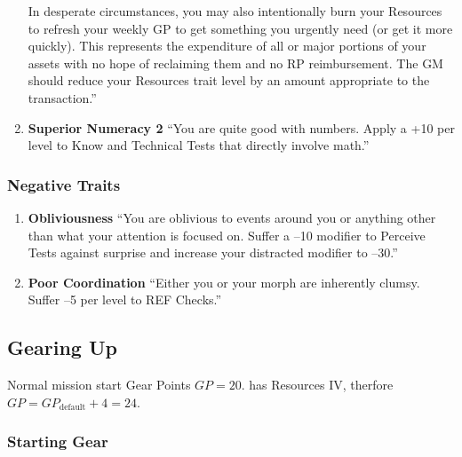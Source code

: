 \begin{enumerate}
    In desperate circumstances, you may also intentionally burn your Resources to refresh your weekly GP to get something you urgently need (or get it more quickly). This represents the expenditure of all or major portions of your assets with no hope of reclaiming them and no RP reimbursement. The GM should reduce your Resources trait level by an amount appropriate to the transaction.” \citep[pg. 76]{ep2e_1.1_2019}

    \item \textbf{\gls{Superior Numeracy} 2} “You are quite good with numbers. Apply a +10 per level to Know and Technical Tests that directly involve math.” \citep[pg. 76]{ep2e_1.1_2019}
\end{enumerate}


\subsubsection{Negative Traits}

\begin{enumerate}
    \item \textbf{\gls{Obliviousness}} “You are oblivious to events around you or anything other than what your attention is focused on. Suffer a –10 modifier to Perceive Tests against surprise and increase your distracted modifier to –30.” \citep[pg. 79]{ep2e_1.1_2019}

    \item \textbf{\gls{Poor Coordination}} “Either you or your morph are inherently clumsy. Suffer –5 per level to REF Checks.” \citep[pg. 79]{ep2e_1.1_2019}
\end{enumerate}


\subsection{Gearing Up}

Normal mission start Gear Points $GP=20$. \texttt{\egr{}}\index{\egr{}} has Resources IV, therfore $GP=GP_{\text{default}}+4=24$.

\subsubsection{Starting Gear}

